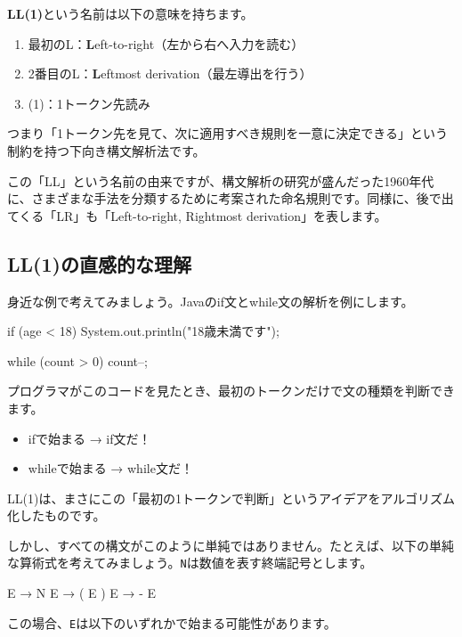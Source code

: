 \textbf{\sffamily LL(1)}という名前は以下の意味を持ちます。

\begin{enumerate}
\item
  最初のL：\textbf{\sffamily L}eft-to-right（左から右へ入力を読む）
\item
  2番目のL：\textbf{\sffamily L}eftmost derivation（最左導出を行う）
\item
  (1)：1トークン先読み
\end{enumerate}

つまり「1トークン先を見て、次に適用すべき規則を一意に決定できる」という制約を持つ下向き構文解析法です。

この「LL」という名前の由来ですが、構文解析の研究が盛んだった1960年代に、さまざまな手法を分類するために考案された命名規則です。同様に、後で出てくる「LR」も「Left-to-right,
Rightmost derivation」を表します。

\subsection{LL(1)の直感的な理解}

身近な例で考えてみましょう。Javaのif文とwhile文の解析を例にします。

\begin{codescreen}{}
if (age < 18) {
    System.out.println("18歳未満です");
}

while (count > 0) {
    count--;
}
\end{codescreen}

プログラマがこのコードを見たとき、最初のトークンだけで文の種類を判断できます。

\begin{itemize}
  \item ifで始まる → if文だ！
  \item whileで始まる → while文だ！
\end{itemize}

LL(1)は、まさにこの「最初の1トークンで判断」というアイデアをアルゴリズム化したものです。

しかし、すべての構文がこのように単純ではありません。たとえば、以下の単純な算術式を考えてみましょう。\texttt{N}は数値を表す終端記号とします。

\begin{codescreen}{}
E  → N
E  → ( E )
E  → - E
\end{codescreen}

この場合、\texttt{E}は以下のいずれかで始まる可能性があります。

